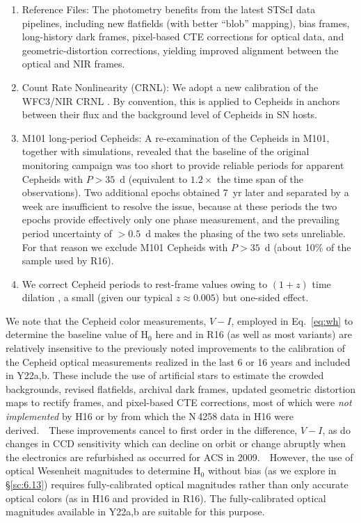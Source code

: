 \documentclass[12pt]{aastex631}
\begin{document}
\begin{enumerate}
\item Reference Files: The photometry benefits from the latest STScI data pipelines, including new flatfields (with better ``blob'' mapping), bias frames, long-history dark frames, pixel-based CTE corrections for optical data, and geometric-distortion corrections, yielding improved alignment between the optical and NIR frames.

\item Count Rate Nonlinearity (CRNL): We adopt a new calibration of the WFC3/NIR CRNL \citep{Riess:2019}.
By convention, this is applied to Cepheids in anchors between their flux and the background level of Cepheids in SN hosts.

\item M101 long-period Cepheids: A re-examination of the Cepheids in M101, together with simulations, revealed that the baseline of the original monitoring campaign \citep[carried out in 2006 and reported by][]{Mager:2013} was too short to provide reliable periods for apparent Cepheids with $P > 35$~d (equivalent to $1.2\times$ the time span of the observations). Two additional epochs obtained 7~yr later and separated by a week are insufficient to resolve the issue, because at these periods the two epochs provide effectively only one phase measurement, and the prevailing period uncertainty of $>0.5$~d makes the phasing of the two sets unreliable. For that reason we exclude M101 Cepheids with $P>35$~d (about 10\% of the sample used by R16).  

\item We correct Cepheid periods to rest-frame values owing to $(1+z)$ time dilation \citep{Anderson:2019}, a small  (given our typical $z \approx 0.005$) but one-sided effect.

\end{enumerate}

 We note that the Cepheid color measurements, $V\!-\!I$, employed in Eq.~\ref{eq:wh} to determine the baseline value of H$_0$ here and in R16 (as well as most variants) are relatively insensitive to the previously noted improvements to the calibration of the Cepheid optical measurements realized in the last 6 or 16 years and included in Y22a,b. These include the use of artificial stars to estimate the crowded backgrounds, revised flatfields, archival dark frames, updated geometric distortion maps to rectify frames, and pixel-based CTE corrections, most of which were {\it not implemented} by H16 or by \cite{macri06} from which the N$\,$4258 data in H16 were derived.  These improvements cancel to first order in the difference, $V\!-\!I$, as do changes in CCD sensitivity which can decline on orbit or change abruptly when the electronics are refurbished as occurred for ACS in 2009.  However, the use of optical Wesenheit magnitudes to determine H$_0$ without bias (as we explore in \S\ref{sc:6.13}) requires fully-calibrated optical magnitudes rather than only accurate optical colors (as in H16 and provided in R16). The fully-calibrated optical magnitudes available in Y22a,b are suitable for this purpose.
\end{document}
